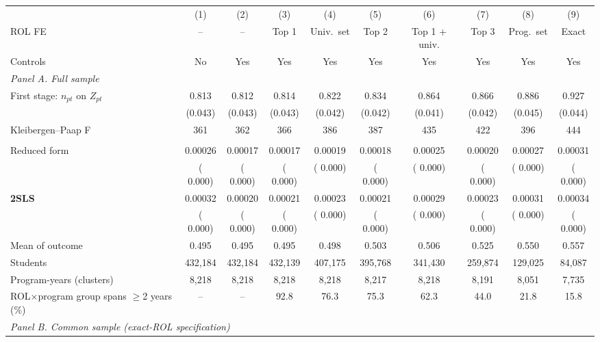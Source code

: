 \begin{tabular}{l*{9}{c}}
\toprule
  & (1) & (2) & (3) & (4) & (5) & (6) & (7) & (8) & (9) \\
ROL FE & -- & -- & Top 1 & Univ.\ set & Top 2 & Top 1 + univ. & Top 3 & Prog.\ set & Exact \\
Controls & No & Yes & Yes & Yes & Yes & Yes & Yes & Yes & Yes \\
\midrule
\multicolumn{10}{l}{\textit{Panel A. Full sample}} \\
First stage: \(n_{pt}\) on \(Z_{pt}\) &  0.813\sym{***} &  0.812\sym{***} &  0.814\sym{***} &  0.822\sym{***} &  0.834\sym{***} &  0.864\sym{***} &  0.866\sym{***} &  0.886\sym{***} &  0.927\sym{***} \\
 & (0.043) & (0.043) & (0.043) & (0.042) & (0.042) & (0.041) & (0.042) & (0.045) & (0.044) \\
Kleibergen--Paap F &    361 &    362 &    366 &    386 &    387 &    435 &    422 &    396 &    444 \\
\addlinespace
\multicolumn{10}{l}{Graduation from any higher-education institution, 8y} \\
\quad Reduced form &  0.00026\sym{***} &  0.00017\sym{**} &  0.00017\sym{**} &  0.00019\sym{**} &  0.00018\sym{*} &  0.00025\sym{**} &  0.00020\sym{*} &  0.00027\sym{**} &  0.00031\sym{**} \\
 & ( 0.000) & ( 0.000) & ( 0.000) & ( 0.000) & ( 0.000) & ( 0.000) & ( 0.000) & ( 0.000) & ( 0.000) \\
\quad \textbf{2SLS} &  0.00032\sym{***} &  0.00020\sym{**} &  0.00021\sym{**} &  0.00023\sym{**} &  0.00021\sym{*} &  0.00029\sym{**} &  0.00023\sym{*} &  0.00031\sym{**} &  0.00034\sym{**} \\
 & ( 0.000) & ( 0.000) & ( 0.000) & ( 0.000) & ( 0.000) & ( 0.000) & ( 0.000) & ( 0.000) & ( 0.000) \\
Mean of outcome & 0.495 & 0.495 & 0.495 & 0.498 & 0.503 & 0.506 & 0.525 & 0.550 & 0.557 \\
Students &   432,184 &   432,184 &   432,139 &   407,175 &   395,768 &   341,430 &   259,874 &   129,025 &    84,087 \\
Program-years (clusters) &  8,218 &  8,218 &  8,218 &  8,218 &  8,217 &  8,218 &  8,191 &  8,051 &  7,735 \\
ROL\(\times\)program group spans \(\geq\)2 years (\%) & -- & -- &  92.8 &  76.3 &  75.3 &  62.3 &  44.0 &  21.8 &  15.8 \\
\midrule
\multicolumn{10}{l}{\textit{Panel B. Common sample (exact-ROL specification)}} \\

\end{tabular}
